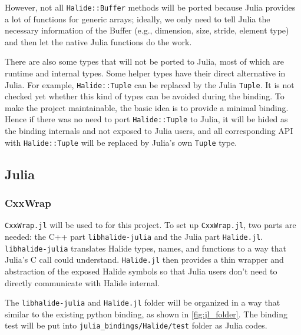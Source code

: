 \documentclass{article}
\begin{document}
However, not all \lstinline{Halide::Buffer} methods will be ported because Julia provides a lot of functions for generic arrays; ideally, we only need to tell Julia the necessary information of the Buffer (e.g., dimension, size, stride, element type) and then let the native Julia functions do the work.

There are also some types that will not be ported to Julia, most of which are runtime and internal types. Some helper types have their direct alternative in Julia. For example, \lstinline{Halide::Tuple} can be replaced by the Julia \lstinline{Tuple}. It is not checked yet whether this kind of types can be avoided during the binding. To make the project maintainable, the basic idea is to provide a minimal binding. Hence if there was no need to port \lstinline{Halide::Tuple} to Julia, it will be hided as the binding internals and not exposed to Julia users, and all corresponding API with \lstinline{Halide::Tuple} will be replaced by Julia's own \lstinline{Tuple} type.

\subsection{Julia}


\subsubsection{CxxWrap}

\lstinline{CxxWrap.jl} will be used to for this project. To set up \lstinline{CxxWrap.jl}, two parts are needed: the C++ part \lstinline{libhalide-julia} and the Julia part \lstinline{Halide.jl}. \lstinline{libhalide-julia} translates Halide types, names, and functions to a way that Julia's C call could understand. \lstinline{Halide.jl} then provides a thin wrapper and abstraction of the exposed Halide symbols so that Julia users don't need to directly communicate with Halide internal.

The \lstinline{libhalide-julia} and \lstinline{Halide.jl} folder will be organized in a way that similar to the existing python binding, as shown in \cref{fig:jl_folder}. The binding test will be put into \lstinline{julia_bindings/Halide/test} folder as Julia codes.
\end{document}
